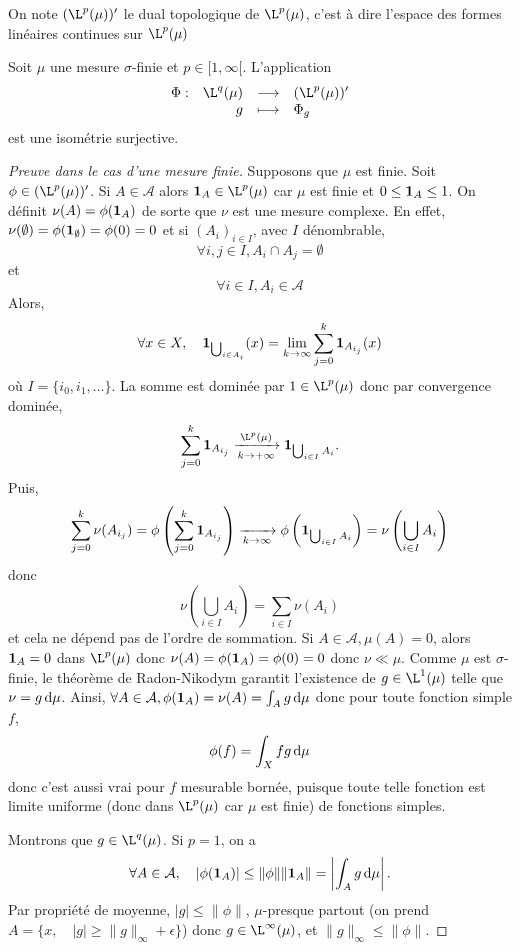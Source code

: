 \begin{dfn}[Notation]
    On note $(\L^p(\mu))'$ le dual topologique de $\L^p(\mu)$, c'est à dire l'espace des formes linéaires continues sur $\L^p(\mu)$
\end{dfn}

\begin{thm}
Soit $\mu$ une mesure $\sigma$-finie et  $p \in  [1, \infty[$. L'application \[
\begin{array}{rrcl}
    \Phi:& \L^q(\mu) & \longrightarrow & (\L^p(\mu))' \\
    & g & \longmapsto & \displaystyle \Phi_g
\end{array}
\] 
est une isométrie surjective.
\end{thm}

\begin{proof}[Preuve dans le cas d'une mesure finie]
Supposons que $\mu$ est finie.  
    Soit $\phi \in (\L^p(\mu))'$. Si $A\in \mathcal{A}$ alors $\1_A\in \L^p(\mu)$ car $\mu$ est finie
    et $0\leq \bm{1}_A\leq 1$.
    On définit $\nu(A)= \phi(\bm{1}_A)$ de sorte que  $\nu$ est une mesure complexe.
    En effet, $\nu(\emptyset)=\phi(\bm{1}_\emptyset)= \phi(0)=0$ 
    et si $(A_i)_{i \in  I}$, avec $I$ dénombrable, \[\forall i,j\in I,A_i\cap A_j=\emptyset\] et \[\forall i\in I,A_i\in \mathcal{A}\]
    Alors,
    \[ \forall x\in X, \quad  \bm{1}_{\bigcup_{i\in A_i}} (x)= \lim_{k\to \infty}\sum_{j=0}^k \bm{1}_{A_{i_j}}(x)\] où $I=\{i_0,i_1,\dots \}$.
    La somme est dominée par  $1\in \L^p(\mu)$ donc par convergence dominée, \[\displaystyle\sum_{j=0}^k \1_{A_{i_j}}\xrightarrow[k\to +\infty]{\L^p(\mu)} \1_{\bigcup_{i\in I}A_i}.\]
    Puis,
        \[\sum_{j=0}^k\nu(A_{i_j}) = \phi\left(\sum_{j=0}^k \bm{1}_{A_{i_j}}\right)\xrightarrow[k\to \infty]{} \phi\left(\bm{1}_{\bigcup_{i\in I}A_i}\right)= \nu\left(\bigcup_{i\in I}A_i\right)\]
        donc \[\nu\left(\bigcup_{i\in I}A_i\right)= \sum_{i\in I}\nu(A_i)\] et cela ne dépend pas de l'ordre de sommation.
Si $A\in \mathcal{A},\mu(A)=0$, alors $\bm{1}_A=0$ dans $\L^p(\mu)$ donc $\nu(A) =\phi(\bm{1}_A) =\phi(0)=0$ donc $\nu\ll \mu$.
Comme $\mu$ est $\sigma$-finie, le théorème de Radon-Nikodym garantit l'existence de $g\in \L^1(\mu)$ telle que $\nu=g\mathop{}\!\mathrm d\mu$.
Ainsi, $\forall A\in \mathcal{A}, \phi(\bm{1}_A) =\nu(A)= \int_Ag\mathop{}\!\mathrm d\mu$ donc pour toute fonction simple $f$, \[\phi(f)=\int_X fg\mathop{}\!\mathrm d\mu\]
donc c'est aussi vrai pour $f$ mesurable bornée, puisque toute telle fonction est limite uniforme (donc dans $\L^p(\mu)$ car $\mu$ est finie) de fonctions simples.

Montrons que $g\in \L^q(\mu)$.
Si $p=1$, on a \[\forall A\in \mathcal{A}, \quad  |\phi(\bm{1}_A)|\leq \|\phi\|\|\bm{1}_A \| =\left| \int_A g\mathop{}\!\mathrm d\mu \right|.\]
Par propriété de moyenne, $|g|\leq \|\phi\|$, $\mu$-presque partout 
(on prend $A= \{x, \quad  |g|\geq \|g\|_{\infty}+\epsilon\}$)
donc $g\in \L^{\infty}(\mu)$, et $\|g\|_\infty \leq \|\phi\|$.


\end{proof}
